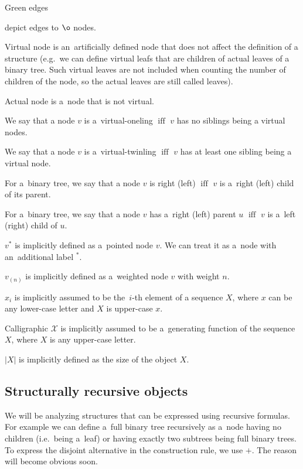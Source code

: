 \documentclass[final]{article}
\theoremstyle{definition}
\theoremstyle{definition}
\theoremstyle{remark}
\newcommand{\gf}[1]{\ensuremath{\mathcal{#1}}}
\newcommand{\pointed}[1]{\ensuremath{{#1}^*}}
\newcommand{\weighted}[1]{\ensuremath{_{(#1)}}}
\newcommand{\size}[1]{\ensuremath{\left|#1\right|}}
\DeclareMathOperator{\textiff}{\text{iff}}
\DeclareMathOperator{\no}{\o}
\begin{document}
Green edges 
\begin{minipage}{1.5em}

\end{minipage}
depict edges to \(\no\) nodes.

Virtual node is an~artificially defined node that does not affect the definition of a structure (e.g.~we can define virtual leafs that are children of actual leaves of a binary tree. Such virtual leaves are not included when counting the number of children of the node, so the actual leaves are still called leaves).

Actual node is a~node that is not virtual.

We say that a node \(v\) is a~virtual-oneling \(\textiff\) \(v\) has no siblings being a virtual nodes.

We say that a node \(v\) is a~virtual-twinling \(\textiff\) \(v\) has at least one sibling being a virtual node.

For a~binary tree, we say that a node \(v\) is right (left) \(\textiff\) \(v\) is a~right (left) child of its parent.

For a~binary tree, we say that a node \(v\) has a~right (left) parent \(u\) \(\textiff\) \(v\) is a~left (right) child of \(u\).

\(\pointed{v}\) is implicitly defined as a~pointed node \(v\). We can treat it as a~node with an~additional label \(\pointed{}\).

\(v\weighted{n}\) is implicitly defined as a~weighted node \(v\) with weight \(n\).

\(x_i\) is implicitly assumed to be the~\(i\)-th element of a sequence \(X\), where \(x\) can be any lower-case letter and \(X\) is upper-case \(x\).

Calligraphic \(\gf{X}\) is implicitly assumed to be a~generating function of the sequence \(X\), where \(X\) is any upper-case letter.

\(\size{X}\) is implicitly defined as the size of the object \(X\).

\subsection{Structurally recursive objects}%
\label{sub:structurally_recursive_objects}

We will be analyzing structures that can be expressed using recursive formulas. For example we can define a~full binary tree recursively as a~node having no children (i.e.~being a~leaf) or having exactly two subtrees being full binary trees. To express the disjoint alternative in the construction rule, we use \(+\). The reason will become obvious soon.
\end{document}

